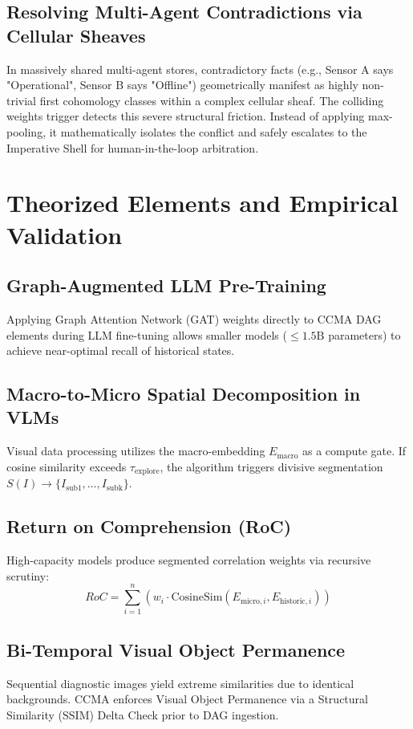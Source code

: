 \documentclass[11pt, a4paper]{article}
\begin{document}
    \subsection{Resolving Multi-Agent Contradictions via Cellular Sheaves}
    In massively shared multi-agent stores, contradictory facts (e.g., Sensor A says "Operational", Sensor B says "Offline") geometrically manifest as highly non-trivial first cohomology classes within a complex cellular sheaf. The colliding weights trigger detects this severe structural friction. Instead of applying max-pooling, it mathematically isolates the conflict and safely escalates to the Imperative Shell for human-in-the-loop arbitration.

	\section{Theorized Elements and Empirical Validation}
	
	\subsection{Graph-Augmented LLM Pre-Training}
	Applying Graph Attention Network (GAT) weights directly to CCMA DAG elements during LLM fine-tuning allows smaller models ($\leq 1.5\text{B}$ parameters) to achieve near-optimal recall of historical states.
	
	\subsection{Macro-to-Micro Spatial Decomposition in VLMs}
	Visual data processing utilizes the macro-embedding $E_{\text{macro}}$ as a compute gate. If cosine similarity exceeds $\tau_{\text{explore}}$, the algorithm triggers divisive segmentation $S(I) \to \{I_{\text{sub1}}, \dots, I_{\text{subk}}\}$.
	
	\subsection{Return on Comprehension (RoC)}
	High-capacity models produce segmented correlation weights via recursive scrutiny:
	\begin{equation}
		RoC = \sum_{i=1}^{n} \left( w_i \cdot \text{CosineSim}(E_{\text{micro}, i}, E_{\text{historic}, i}) \right)
	\end{equation}
	
	\subsection{Bi-Temporal Visual Object Permanence}
	Sequential diagnostic images yield extreme similarities due to identical backgrounds. CCMA enforces Visual Object Permanence via a Structural Similarity (SSIM) Delta Check prior to DAG ingestion.
	
\end{document}
